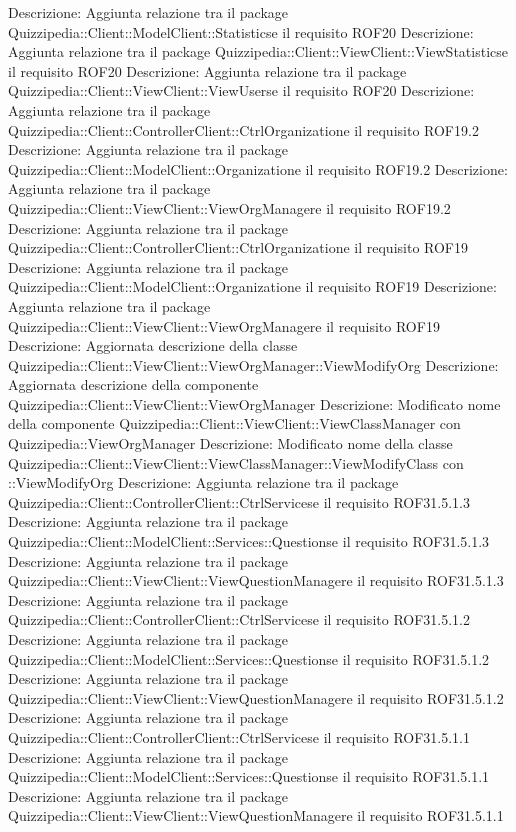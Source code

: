 Descrizione: Aggiunta relazione tra il package Quizzipedia::Client::ModelClient::Statisticse il requisito ROF20 
Descrizione: Aggiunta relazione tra il package Quizzipedia::Client::ViewClient::ViewStatisticse il requisito ROF20 
Descrizione: Aggiunta relazione tra il package Quizzipedia::Client::ViewClient::ViewUserse il requisito ROF20 
Descrizione: Aggiunta relazione tra il package Quizzipedia::Client::ControllerClient::CtrlOrganizatione il requisito ROF19.2 
Descrizione: Aggiunta relazione tra il package Quizzipedia::Client::ModelClient::Organizatione il requisito ROF19.2 
Descrizione: Aggiunta relazione tra il package Quizzipedia::Client::ViewClient::ViewOrgManagere il requisito ROF19.2 
Descrizione: Aggiunta relazione tra il package Quizzipedia::Client::ControllerClient::CtrlOrganizatione il requisito ROF19 
Descrizione: Aggiunta relazione tra il package Quizzipedia::Client::ModelClient::Organizatione il requisito ROF19 
Descrizione: Aggiunta relazione tra il package Quizzipedia::Client::ViewClient::ViewOrgManagere il requisito ROF19 
Descrizione: Aggiornata descrizione della classe Quizzipedia::Client::ViewClient::ViewOrgManager::ViewModifyOrg 
Descrizione: Aggiornata descrizione della componente Quizzipedia::Client::ViewClient::ViewOrgManager 
Descrizione: Modificato nome della componente Quizzipedia::Client::ViewClient::ViewClassManager con Quizzipedia::ViewOrgManager 
Descrizione: Modificato nome della classe Quizzipedia::Client::ViewClient::ViewClassManager::ViewModifyClass con ::ViewModifyOrg 
Descrizione: Aggiunta relazione tra il package Quizzipedia::Client::ControllerClient::CtrlServicese il requisito ROF31.5.1.3 
Descrizione: Aggiunta relazione tra il package Quizzipedia::Client::ModelClient::Services::Questionse il requisito ROF31.5.1.3 
Descrizione: Aggiunta relazione tra il package Quizzipedia::Client::ViewClient::ViewQuestionManagere il requisito ROF31.5.1.3 
Descrizione: Aggiunta relazione tra il package Quizzipedia::Client::ControllerClient::CtrlServicese il requisito ROF31.5.1.2 
Descrizione: Aggiunta relazione tra il package Quizzipedia::Client::ModelClient::Services::Questionse il requisito ROF31.5.1.2 
Descrizione: Aggiunta relazione tra il package Quizzipedia::Client::ViewClient::ViewQuestionManagere il requisito ROF31.5.1.2 
Descrizione: Aggiunta relazione tra il package Quizzipedia::Client::ControllerClient::CtrlServicese il requisito ROF31.5.1.1 
Descrizione: Aggiunta relazione tra il package Quizzipedia::Client::ModelClient::Services::Questionse il requisito ROF31.5.1.1 
Descrizione: Aggiunta relazione tra il package Quizzipedia::Client::ViewClient::ViewQuestionManagere il requisito ROF31.5.1.1 
